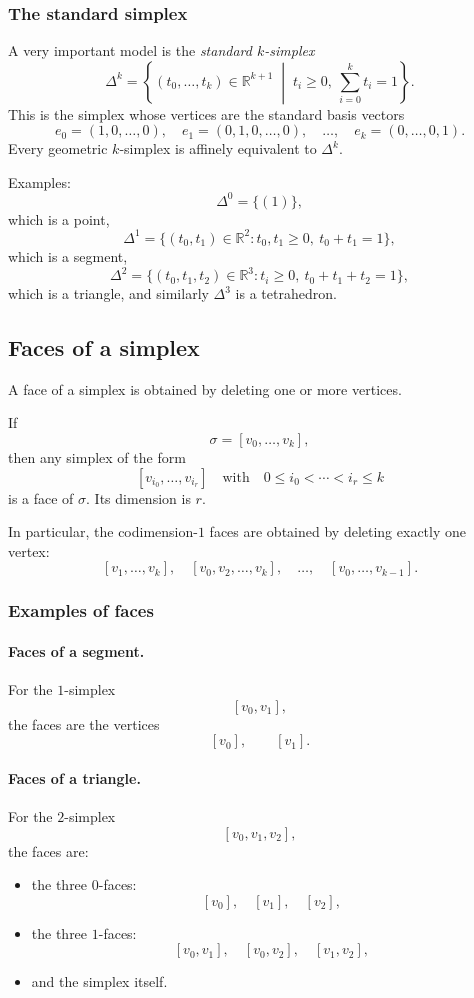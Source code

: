 \documentclass[12pt,a4paper]{article}
\theoremstyle{notespace}
\begin{document}
\subsubsection{The standard simplex}

A very important model is the \emph{standard \(k\)-simplex}
\[
\Delta^k
=
\left\{
(t_0,\dots,t_k)\in \mathbb{R}^{k+1}
\;\middle|\;
t_i\ge 0,\ \sum_{i=0}^k t_i=1
\right\}.
\]
This is the simplex whose vertices are the standard basis vectors
\[
e_0=(1,0,\dots,0),\quad e_1=(0,1,0,\dots,0),\quad \dots,\quad e_k=(0,\dots,0,1).
\]
Every geometric \(k\)-simplex is affinely equivalent to \(\Delta^k\).

Examples:
\[
\Delta^0=\{(1)\},
\]
which is a point,
\[
\Delta^1=\{(t_0,t_1)\in \mathbb{R}^2: t_0,t_1\ge 0,\ t_0+t_1=1\},
\]
which is a segment,
\[
\Delta^2=\{(t_0,t_1,t_2)\in \mathbb{R}^3: t_i\ge 0,\ t_0+t_1+t_2=1\},
\]
which is a triangle,
and similarly \(\Delta^3\) is a tetrahedron.

\subsection{Faces of a simplex}

A face of a simplex is obtained by deleting one or more vertices.

If
\[
\sigma=[v_0,\dots,v_k],
\]
then any simplex of the form
\[
[v_{i_0},\dots,v_{i_r}]
\quad\text{with}\quad
0\le i_0<\cdots<i_r\le k
\]
is a face of \(\sigma\). Its dimension is \(r\).

In particular, the codimension-\(1\) faces are obtained by deleting exactly one vertex:
\[
[v_1,\dots,v_k],\quad
[v_0,v_2,\dots,v_k],\quad
\dots,\quad
[v_0,\dots,v_{k-1}].
\]

\subsubsection{Examples of faces}

\paragraph{Faces of a segment.}
For the \(1\)-simplex
\[
[v_0,v_1],
\]
the faces are the vertices
\[
[v_0],\qquad [v_1].
\]

\paragraph{Faces of a triangle.}
For the \(2\)-simplex
\[
[v_0,v_1,v_2],
\]
the faces are:
\begin{itemize}
	\item the three \(0\)-faces:
	\[
	[v_0],\quad [v_1],\quad [v_2],
	\]
	\item the three \(1\)-faces:
	\[
	[v_0,v_1],\quad [v_0,v_2],\quad [v_1,v_2],
	\]
	\item and the simplex itself.
\end{itemize}
\end{document}
